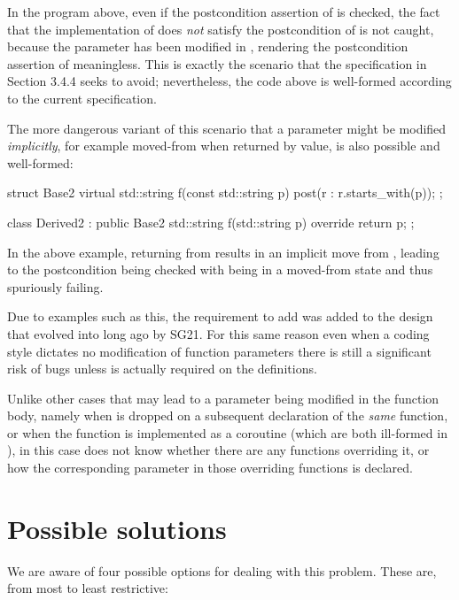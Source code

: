In the program above, even if the postcondition assertion of  is checked, the fact that the implementation of  does \emph{not} satisfy the postcondition of  is not caught, because the parameter  has been modified in , rendering the postcondition assertion of  meaningless. This is exactly the scenario that the specification in \cite{P2900R10} Section 3.4.4 seeks to avoid; nevertheless, the code above is well-formed according to the current specification.

The more dangerous variant of this scenario that a parameter might be modified \emph{implicitly}, for example moved-from when returned by value, is also possible and well-formed:
\begin{codeblock}
struct Base2 {
  virtual std::string f(const std::string p) post(r : r.starts_with(p));
};

class Derived2 : public Base2 {
  std::string f(std::string p) override {
    return p;
  }
};
\end{codeblock}
In the above example, returning  from  results in an implicit move from , leading to the postcondition being checked with  being in a moved-from state and thus spuriously failing.

Due to examples such as this, the requirement to add  was added to the design that evolved into \cite{P2900R10} long ago by SG21. For this same reason even when a coding style dictates no modification of function parameters there is still a significant risk of bugs unless  is actually required on the definitions.

Unlike other cases that may lead to a  parameter being modified in the function body, namely when  is dropped on a subsequent declaration of the \emph{same} function, or when the function is implemented as a coroutine (which are both ill-formed in \cite{P2900R10}), in this case  does not know whether there are any functions overriding it, or how the corresponding parameter in those overriding functions is declared.

\section{Possible solutions}

We are aware of four possible options for dealing with this problem. These are, from most to least restrictive:


